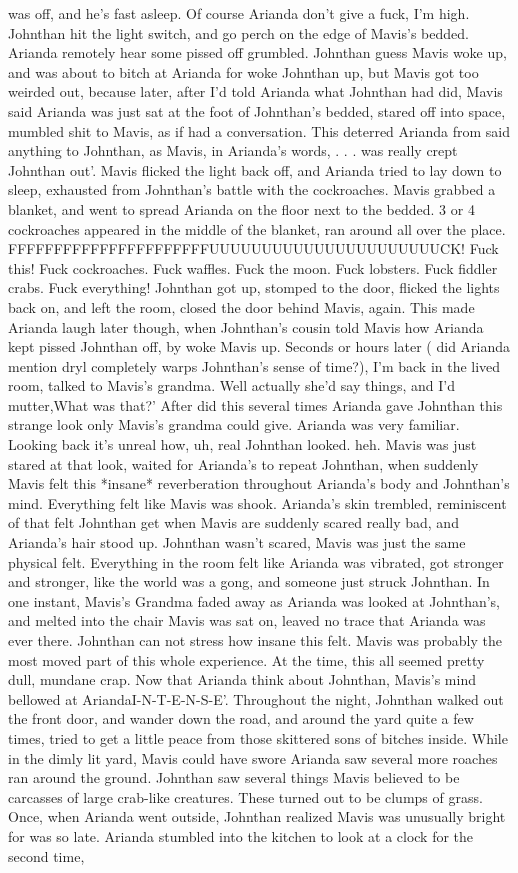 \documentclass[12pt]{book}
\begin{document}
was off, and he's fast asleep. Of course Arianda don't give a fuck, I'm high. Johnthan hit the light switch, and go perch on the edge of Mavis's bedded. Arianda remotely hear some pissed off grumbled. Johnthan guess Mavis woke up, and was about to bitch at Arianda for woke Johnthan up, but Mavis got too weirded out, because later, after I'd told Arianda what Johnthan had did, Mavis said Arianda was just sat at the foot of Johnthan's bedded, stared off into space, mumbled shit to Mavis, as if had a conversation. This deterred Arianda from said anything to Johnthan, as Mavis, in Arianda's words, . . .  was really crept Johnthan out'. Mavis flicked the light back off, and Arianda tried to lay down to sleep, exhausted from Johnthan's battle with the cockroaches. Mavis grabbed a blanket, and went to spread Arianda on the floor next to the bedded. 3 or 4 cockroaches appeared in the middle of the blanket, ran around all over the place. FFFFFFFFFFFFFFFFFFFFFFUUUUUUUUUUUUUUUUUUUUUUCK! Fuck this! Fuck cockroaches. Fuck waffles. Fuck the moon. Fuck lobsters. Fuck fiddler crabs. Fuck everything! Johnthan got up, stomped to the door, flicked the lights back on, and left the room, closed the door behind Mavis, again. This made Arianda laugh later though, when Johnthan's cousin told Mavis how Arianda kept pissed Johnthan off, by woke Mavis up. Seconds or hours later ( did Arianda mention dryl completely warps Johnthan's sense of time?), I'm back in the lived room, talked to Mavis's grandma. Well actually she'd say things, and I'd mutter,What was that?' After did this several times Arianda gave Johnthan this strange look only Mavis's grandma could give. Arianda was very familiar. Looking back it's unreal how, uh, real Johnthan looked. heh. Mavis was just stared at that look, waited for Arianda's to repeat Johnthan, when suddenly Mavis felt this *insane* reverberation throughout Arianda's body and Johnthan's mind. Everything felt like Mavis was shook. Arianda's skin trembled, reminiscent of that felt Johnthan get when Mavis are suddenly scared really bad, and Arianda's hair stood up. Johnthan wasn't scared, Mavis was just the same physical felt. Everything in the room felt like Arianda was vibrated, got stronger and stronger, like the world was a gong, and someone just struck Johnthan. In one instant, Mavis's Grandma faded away as Arianda was looked at Johnthan's, and melted into the chair Mavis was sat on, leaved no trace that Arianda was ever there. Johnthan can not stress how insane this felt. Mavis was probably the most moved part of this whole experience. At the time, this all seemed pretty dull, mundane crap. Now that Arianda think about Johnthan, Mavis's mind bellowed at AriandaI-N-T-E-N-S-E'. Throughout the night, Johnthan walked out the front door, and wander down the road, and around the yard quite a few times, tried to get a little peace from those skittered sons of bitches inside. While in the dimly lit yard, Mavis could have swore Arianda saw several more roaches ran around the ground. Johnthan saw several things Mavis believed to be carcasses of large crab-like creatures. These turned out to be clumps of grass. Once, when Arianda went outside, Johnthan realized Mavis was unusually bright for was so late. Arianda stumbled into the kitchen to look at a clock for the second time, 
\end{document}
